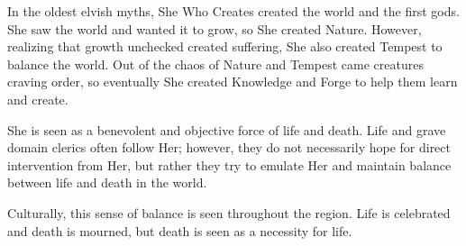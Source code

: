 In the oldest elvish myths, She Who Creates created the world and the first gods.
She saw the world and wanted it to grow, so She created Nature.
However, realizing that growth unchecked created suffering, She also created Tempest to balance the world.
Out of the chaos of Nature and Tempest came creatures craving order, so eventually She created Knowledge and Forge to help them learn and create.

She is seen as a benevolent and objective force of life and death.
Life and grave domain clerics often follow Her; however, they do not necessarily hope for direct intervention from Her, but rather they try to emulate Her and maintain balance between life and death in the world.

Culturally, this sense of balance is seen throughout the region.
Life is celebrated and death is mourned, but death is seen as a necessity for life.
